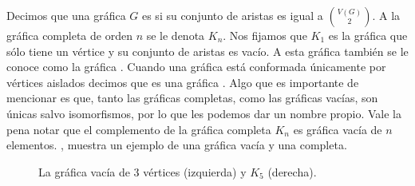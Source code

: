 Decimos que una gr\'afica $G$ es  si su conjunto
de aristas es igual a $\binom{V(G)}{2}$. A la gr\'afica completa de orden $n$ se
le denota $K_n$. Nos fijamos que $K_1$ es la gr\'afica que s\'olo tiene un
v\'ertice y su conjunto de aristas es vac\'io. A esta gr\'afica tambi\'en se le
conoce como la gr\'afica . Cuando una gr\'afica est\'a
conformada \'unicamente por v\'ertices aislados decimos que es una gr\'afica
. Algo que es importante de mencionar es que,
tanto las gr\'aficas completas, como las gr\'aficas vac\'ias, son \'unicas salvo
isomorfismos, por lo que les podemos dar un nombre propio. Vale la pena notar
que el complemento de la gr\'afica completa $K_n$ es gr\'afica vac\'ia de $n$
elementos. , muestra un ejemplo de una gr\'afica vac\'ia y
una completa.

\begin{figure}[ht!]
    \centering
        \caption{La gr\'afica vac\'ia de 3 v\'ertices (izquierda) y $K_5$
        (derecha).}
        \label{fig:ex-va-comp}
    \end{figure} 

